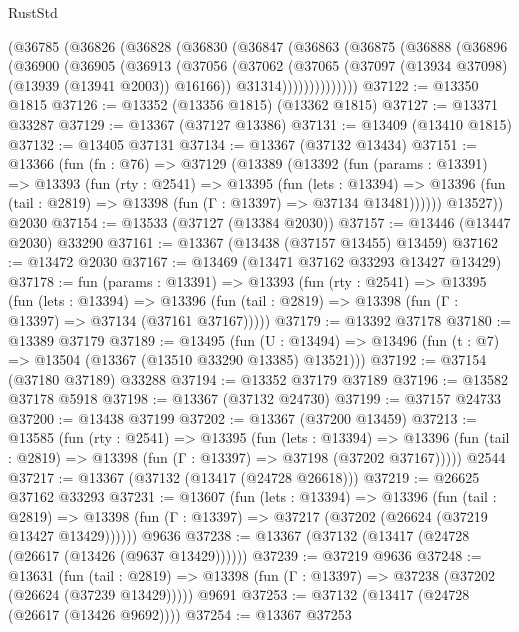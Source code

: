 \begin{lexlean}{RustStd}
\begin{coremodule}
    (@36785
      (@36826
        (@36828
          (@36830
            (@36847
              (@36863
                (@36875
                  (@36888
                    (@36896
                      (@36900
                        (@36905
                          (@36913
                            (@37056
                              (@37062
                                (@37065 (@37097 (@13934 @37098) (@13939 (@13941 @2003)) @16166))
                                @31314))))))))))))))
@37122 := @13350 @1815
@37126 := @13352 (@13356 @1815) (@13362 @1815)
@37127 := @13371 @33287
@37129 := @13367 (@37127 @13386)
@37131 := @13409 (@13410 @1815)
@37132 := @13405 @37131
@37134 := @13367 (@37132 @13434)
@37151 := @13366
    (fun (fn : @76) =>
    @37129
      (@13389
        (@13392
          (fun (params : @13391) =>
          @13393
            (fun (rty : @2541) =>
            @13395
              (fun (lets : @13394) =>
              @13396 (fun (tail : @2819) => @13398 (fun (Γ : @13397) => @37134 @13481))))))
        @13527))
    @2030
@37154 := @13533 (@37127 (@13384 @2030))
@37157 := @13446 (@13447 @2030) @33290
@37161 := @13367 (@13438 (@37157 @13455) @13459)
@37162 := @13472 @2030
@37167 := @13469 (@13471 @37162 @33293 @13427 @13429)
@37178 := fun (params : @13391) =>
  @13393
    (fun (rty : @2541) =>
    @13395
      (fun (lets : @13394) =>
      @13396 (fun (tail : @2819) => @13398 (fun (Γ : @13397) => @37134 (@37161 @37167)))))
@37179 := @13392 @37178
@37180 := @13389 @37179
@37189 := @13495
    (fun (U : @13494) => @13496 (fun (t : @7) => @13504 (@13367 (@13510 @33290 @13385) @13521)))
@37192 := @37154 (@37180 @37189) @33288
@37194 := @13352 @37179 @37189
@37196 := @13582 @37178 @5918
@37198 := @13367 (@37132 @24730)
@37199 := @37157 @24733
@37200 := @13438 @37199
@37202 := @13367 (@37200 @13459)
@37213 := @13585
    (fun (rty : @2541) =>
    @13395
      (fun (lets : @13394) =>
      @13396 (fun (tail : @2819) => @13398 (fun (Γ : @13397) => @37198 (@37202 @37167)))))
    @2544
@37217 := @13367 (@37132 (@13417 (@24728 @26618)))
@37219 := @26625 @37162 @33293
@37231 := @13607
    (fun (lets : @13394) =>
    @13396
      (fun (tail : @2819) =>
      @13398 (fun (Γ : @13397) => @37217 (@37202 (@26624 (@37219 @13427 @13429))))))
    @9636
@37238 := @13367 (@37132 (@13417 (@24728 (@26617 (@13426 (@9637 @13429))))))
@37239 := @37219 @9636
@37248 := @13631
    (fun (tail : @2819) => @13398 (fun (Γ : @13397) => @37238 (@37202 (@26624 (@37239 @13429)))))
    @9691
@37253 := @37132 (@13417 (@24728 (@26617 (@13426 @9692))))
@37254 := @13367 @37253

\end{coremodule}
\end{lexlean}
